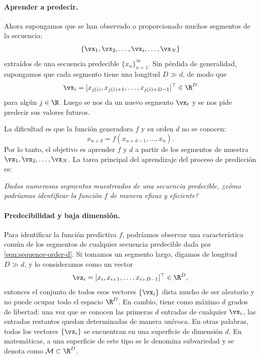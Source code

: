 \documentclass[../../book-main_es.tex]{subfiles}
\begin{document}
\paragraph{Aprender a predecir.}
Ahora supongamos que se han observado o proporcionado muchos 
segmentos de la secuencia:
\begin{equation}
    \{\vx_{1}, \vx_{2}, \ldots, \vx_{i}, \ldots, \vx_{N}\}
\end{equation}
extraídos de una secuencia predecible \(\{x_{n}\}_{n=1}^{\infty}\).
Sin pérdida de generalidad, supongamos que cada segmento tiene una
longitud \(D \gg d\), de modo que
\begin{equation}
    \vx_{i} = [x_{j(i)}, x_{j(i)+1}, \ldots, x_{j(i)+D-1}]^{\top} \in \R^{D}
\end{equation}
para algún \(j \in \N\). Luego se nos da un nuevo segmento \(\vx_{t}\) y se
nos pide predecir sus valores futuros.

La dificultad es que la función generadora \(f\) y su orden
\(d\) no se conocen:
\begin{equation}
    x_{n+d} = f(x_{n+d-1}, \ldots, x_{n}).
    \label{eqn:sequence-order-d}
\end{equation}
Por lo tanto, el objetivo es aprender \(f\) y \(d\) a partir de los segmentos 
de muestra \(\vx_{1}, \vx_{2}, \ldots, \vx_{N}\). La tarea principal del
aprendizaje del proceso de predicción es:
\begin{center}
    \textit{Dados numerosos segmentos muestreados de una secuencia predecible,
    ¿cómo podríamos identificar la función \(f\) de manera eficaz y eficiente?}
\end{center}

\paragraph{Predecibilidad y baja dimensión.}
Para identificar la función predictiva \(f\), podríamos observar una 
característica común de los segmentos de cualquier secuencia predecible 
dada por \eqref{eqn:sequence-order-d}. Si tomamos un segmento largo, digamos de
longitud \(D \gg d\), y lo consideramos como un vector
\begin{equation}
    \vx_{i} = [x_{i}, x_{i+1}, \ldots, x_{i+D-1}]^{\top} \in \R^{D},
    \label{eqn:segment-vector}
\end{equation}
entonces el conjunto de todos esos vectores \(\{\vx_{i}\}\) dista mucho de 
ser aleatorio y no puede ocupar todo el espacio \(\R^{D}\). 
En cambio, tiene como máximo \(d\) grados de libertad: una vez que se conocen 
las primeras \(d\) entradas de cualquier \(\vx_{i}\), las entradas restantes 
quedan determinadas de manera unívoca. En otras palabras, todos los vectores 
 \(\{\vx_{i}\}\) se encuentran en una superficie de dimensión \(d\).
En matemáticas, a una superficie de este tipo se le denomina subvariedad y se 
denota como \(\mathcal{M} \subset \R^{D}\).
\end{document}
